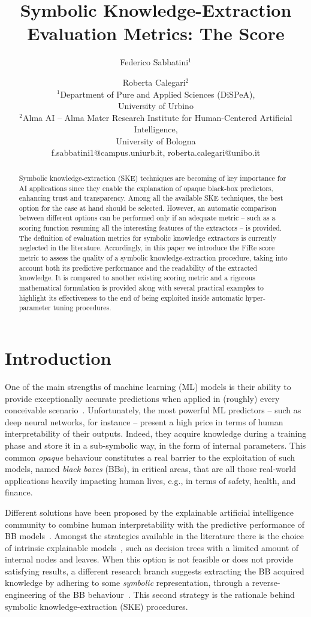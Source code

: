\documentclass{article}
\title{Symbolic Knowledge-Extraction Evaluation Metrics: The \fire{} Score}
\author{%
	Federico Sabbatini$^1$\and
	Roberta Calegari$^2$\\
	\affiliations
	$^1$Department of Pure and Applied Sciences (DiSPeA),\\University of Urbino\\
	$^2$Alma AI -- Alma Mater Research Institute for Human-Centered Artificial Intelligence,\\University of Bologna\\
	\emails
	f.sabbatini1@campus.uniurb.it,
	roberta.calegari@unibo.it
}
\newcommand{\fire}{FiRe}
\begin{document}
	
\maketitle

\begin{abstract}
	Symbolic knowledge-extraction (SKE) techniques are becoming of key importance for AI applications since they enable the explanation of opaque black-box predictors, enhancing trust and transparency.
	Among all the available SKE techniques, the best option for the case at hand should be selected.
	However, an automatic comparison between different options can be performed only if an adequate metric -- such as a scoring function resuming all the interesting features of the extractors -- is provided. 
	The definition of evaluation metrics for symbolic knowledge extractors is currently neglected in the literature.
	Accordingly, in this paper we introduce the \fire{} score metric to assess the quality of a symbolic knowledge-extraction procedure, taking into account both its predictive performance and the readability of the extracted knowledge.
	It is compared to another existing scoring metric and a rigorous mathematical formulation is provided along with several practical examples to highlight its effectiveness to the end of being exploited inside automatic hyper-parameter tuning procedures.
\end{abstract}

\section{Introduction}
One of the main strengths of machine learning (ML) models is their ability to provide exceptionally accurate predictions when applied in (roughly) every conceivable scenario~\cite{rocha2012far}.
%
Unfortunately, the most powerful ML predictors -- such as deep neural networks, for instance -- present a high price in terms of human interpretability of their outputs.
%
Indeed, they acquire knowledge during a training phase and store it in a sub-symbolic way, in the form of internal parameters.
%
This common \emph{opaque} behaviour constitutes a real barrier to the exploitation of such models, named \emph{black boxes} (BBs), in critical areas, that are all those real-world applications heavily impacting human lives, e.g., in terms of safety, health, and finance.

Different solutions have been proposed by the explainable artificial intelligence community to combine human interpretability with the predictive performance of BB models~\cite{guidotti2018survey}.
%
Amongst the strategies available in the literature there is the choice of intrinsic explainable models~\cite{Rudin2019}, such as decision trees with a limited amount of internal nodes and leaves.
%
When this option is not feasible or does not provide satisfying results, a different research branch suggests extracting the BB acquired knowledge by adhering to some \emph{symbolic} representation, through a reverse-engineering of the BB behaviour~\cite{KENNY2021103459}.
%
This second strategy is the rationale behind symbolic knowledge-extraction (SKE) procedures.
\end{document}
